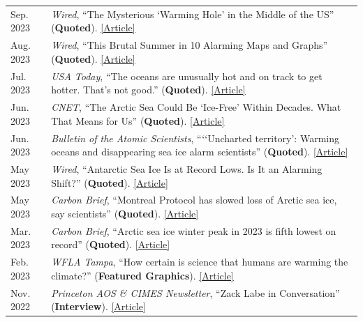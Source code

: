 \documentclass[margin,line,palatino,courier,10pt]{res}
\begin{document}
\begin{resume}
\begin{tabular}{@{}p{0.9in}p{4in}}
Sep. 2023 & \textit{Wired}, ``The Mysterious `Warming Hole' in the Middle of the US'' (\textbf{Quoted}). \href{https://www.wired.com/story/the-mysterious-warming-hole-in-the-middle-of-the-us/}{[Article]}\\
Aug. 2023 & \textit{Wired}, ``This Brutal Summer in 10 Alarming Maps and Graphs'' (\textbf{Quoted}). \href{https://www.wired.com/story/this-brutal-summer-in-10-alarming-maps-and-graphs/}{[Article]}\\
Jul. 2023 & \textit{USA Today}, ``The oceans are unusually hot and on track to get hotter. That’s not good.'' (\textbf{Quoted}). \href{https://www.usatoday.com/story/news/nation/2023/07/04/heat-waves-in-oceans-fueled-by-climate-change/70339174007/}{[Article]}\\
Jun. 2023 & \textit{CNET}, ``The Arctic Sea Could Be `Ice-Free' Within Decades. What That Means for Us'' (\textbf{Quoted}). \href{https://www.cnet.com/science/climate/the-arctic-sea-could-be-ice-free-within-decades-what-that-means-for-us/}{[Article]}\\
Jun. 2023 & \textit{Bulletin of the Atomic Scientists}, ```‘Uncharted territory': Warming oceans and disappearing sea ice alarm scientists'' (\textbf{Quoted}). \href{https://thebulletin.org/2023/06/uncharted-territory-warming-oceans-and-disappearing-sea-ice-alarm-scientists/}{[Article]}\\
May 2023 & \textit{Wired}, ``Antarctic Sea Ice Is at Record Lows. Is It an Alarming Shift?'' (\textbf{Quoted}). \href{https://www.wired.com/story/antarctic-sea-ice-is-at-record-lows-is-it-an-alarming-shift/}{[Article]}\\
May 2023 & \textit{Carbon Brief}, ``Montreal Protocol has slowed loss of Arctic sea ice, say scientists'' (\textbf{Quoted}). \href{https://www.carbonbrief.org/montreal-protocol-has-slowed-loss-of-arctic-sea-say-scientists/}{[Article]}\\
Mar. 2023 & \textit{Carbon Brief}, ``Arctic sea ice winter peak in 2023 is fifth lowest on record'' (\textbf{Quoted}). \href{https://www.carbonbrief.org/arctic-sea-ice-winter-peak-in-2023-is-fifth-lowest-on-record/}{[Article]}\\
Feb. 2023 & \textit{WFLA Tampa}, ``How certain is science that humans are warming the climate?'' (\textbf{Featured Graphics}). \href{https://www.wfla.com/weather/climate-classroom/how-certain-is-science-that-humans-are-warming-the-climate/}{[Article]}\\
Nov. 2022 & \textit{Princeton AOS \& CIMES Newsletter}, ``Zack Labe in Conversation'' (\textbf{Interview}). \href{https://aos.princeton.edu/sites/g/files/toruqf1176/files/documents/AOS\%20\%26\%20CIMES\%20Newsletter\%20Fall\%202022.pdf}{[Article]}\\

\end{tabular}
\end{resume}
\end{document}
